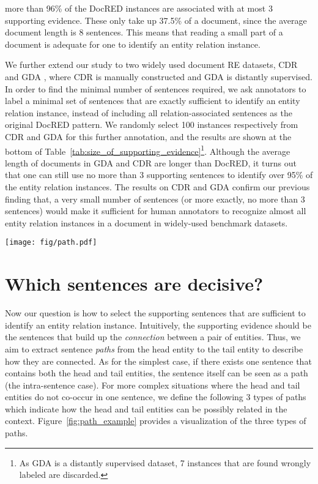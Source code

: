 \documentclass[11pt,a4paper]{article}
\begin{document}
more than 96\% of the DocRED instances are associated with at most 3 supporting evidence. These only take up 37.5\% of a document, since the average document length is 8 sentences.
This means that reading a small part of a document is adequate for one to identify an entity relation instance. 

We further extend our study to two widely used document RE datasets, CDR \cite{li2016biocreative} and GDA \cite{wu2019renet}, 
where CDR is manually constructed and GDA is distantly supervised.
In order to find the minimal number of sentences required, we ask annotators to label a minimal set of sentences that are exactly sufficient to identify an entity relation instance, instead of including all relation-associated sentences as the original DocRED pattern. We randomly select 100 instances respectively from CDR and GDA for this further annotation, and the results are shown at the bottom of Table~\ref{tab:size_of_supporting_evidence}\footnote{As GDA is a distantly supervised dataset, 7 instances that are found wrongly labeled are discarded.}. Although the average length of documents in GDA and CDR are longer than DocRED, it turns out that one can still use no more than 3 supporting sentences to identify over 95\% of the entity relation instances.  
The results on CDR and GDA confirm our previous finding that, a very small number of sentences (or more exactly, no more than 3 sentences) would make it sufficient for human annotators to recognize almost all entity relation instances in a document in widely-used benchmark datasets.

\begin{figure*}
    \centering
    \texttt{[image: fig/path.pdf]}
    \caption{Types of paths connecting head and tail entities. The rounded rectangles represent sentences and the circles are mentions of involved entities or other irrelevant tokens. $e_h$ and $e_t$ stands for a mention of head and tail entities respectively, and $S_*$ represents a sentence.}
    \label{fig:path_example}
\end{figure*}

\section{Which sentences are decisive?}
\label{sec:decisive}


Now our question is how to select the supporting sentences  that are sufficient to identify an entity relation instance.
Intuitively, the supporting evidence should be the sentences that build up the \textit{connection} between a pair of entities. 
Thus, we aim to extract sentence \textit{paths} from the head entity to the tail entity to describe how they are connected. 
As for the simplest case, if there exists one sentence that contains both the head and tail entities, the sentence itself can be seen as a path (the intra-sentence case). For more complex situations where the head and tail entities do not co-occur in one sentence, we define the following 3 types of paths which indicate how the head and tail entities can be possibly related in the context. Figure~\ref{fig:path_example} provides a visualization of the three types of paths.
\end{document}
